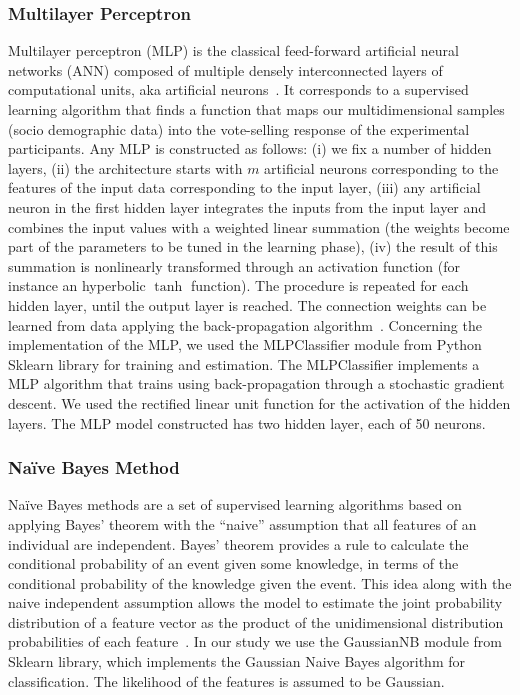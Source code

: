 \documentclass[onesided]{article}\usepackage[]{graphicx}\usepackage[]{color}
\begin{document}
\subsubsection{Multilayer Perceptron} Multilayer perceptron (MLP) is the classical feed-forward artificial neural networks (ANN) composed of multiple densely interconnected layers of computational units, aka artificial neurons~\cite{wolff2019machine}. It corresponds to a supervised learning algorithm that finds a function that maps our multidimensional samples (socio demographic data) into the vote-selling response of the experimental participants. Any MLP is constructed as follows: (i) we fix a number of hidden layers, (ii) the architecture starts with $m$ artificial neurons corresponding to the features of the input data corresponding to the input layer, (iii) any artificial neuron in the first hidden layer integrates the inputs from the input layer and combines the input values with a weighted linear summation (the weights become part of the parameters to be tuned in the learning phase), (iv) the result of this summation is nonlinearly transformed through an activation function (for instance an hyperbolic $\tanh$ function). The procedure is repeated for each hidden layer, until the output layer is reached. The connection weights can be learned from data applying the back-propagation algorithm~\cite{haykin2004comprehensive}. Concerning the implementation of the MLP, we used the MLPClassifier module from Python Sklearn library for training and estimation. The MLPClassifier implements a MLP algorithm that trains using back-propagation through a stochastic gradient descent. We used the rectified linear unit function for the activation of the hidden layers. The MLP model constructed has two hidden layer, each of 50 neurons.

\subsubsection{Na\"ive Bayes Method} Na\"ive Bayes methods are a set of supervised learning algorithms based on applying Bayes' theorem with the ``naive'' assumption that all features of an individual are independent. Bayes' theorem provides a rule to calculate the conditional probability of an event given some knowledge, in terms of the conditional probability of the knowledge given the event. This idea along with the naive independent assumption allows the model to estimate the joint probability distribution of a  feature vector as the product of the unidimensional distribution probabilities of each feature~\cite{wolff2019machine}. In our study we use the GaussianNB module from Sklearn library, which implements the Gaussian Naive Bayes algorithm for classification. The likelihood of the features is assumed to be Gaussian.
\end{document}
